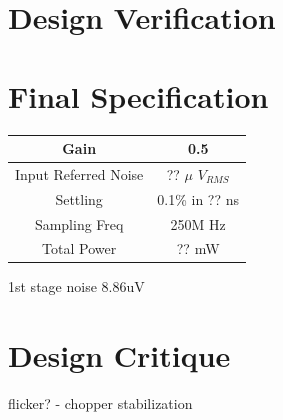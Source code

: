 \documentclass[conference]{IEEEtran}
\begin{document}
\section{Design Verification}



\section{Final Specification}

\begin{center}
\begin{tabular}{|c|c|} 
\hline
Gain & 0.5 \\
\hline
Input Referred Noise & ?? $\mu$ $V_{RMS}$ \\
\hline
Settling & 0.1\% in ?? ns \\
\hline
Sampling Freq & 250M Hz \\
\hline
Total Power & ?? mW \\
\hline
\end{tabular}
\end{center}

1st stage noise 8.86uV


\section{Design Critique}

flicker? - chopper stabilization
\end{document}

